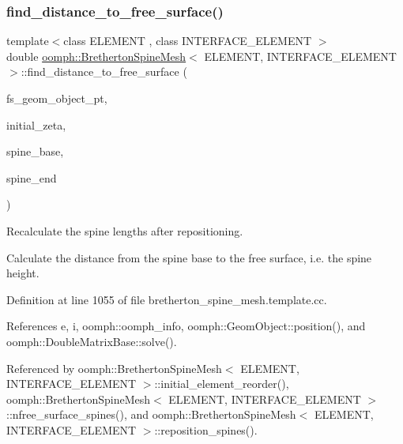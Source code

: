 \subsubsection{\texorpdfstring{find\+\_\+distance\+\_\+to\+\_\+free\+\_\+surface()}{find\_distance\_to\_free\_surface()}}
{\footnotesize\ttfamily template$<$class E\+L\+E\+M\+E\+NT , class I\+N\+T\+E\+R\+F\+A\+C\+E\+\_\+\+E\+L\+E\+M\+E\+NT $>$ \\
double \hyperlink{classoomph_1_1BrethertonSpineMesh}{oomph\+::\+Bretherton\+Spine\+Mesh}$<$ E\+L\+E\+M\+E\+NT, I\+N\+T\+E\+R\+F\+A\+C\+E\+\_\+\+E\+L\+E\+M\+E\+NT $>$\+::find\+\_\+distance\+\_\+to\+\_\+free\+\_\+surface (\begin{DoxyParamCaption}\item[{\hyperlink{classoomph_1_1GeomObject}{Geom\+Object} $\ast$const \&}]{fs\+\_\+geom\+\_\+object\+\_\+pt,  }\item[{\hyperlink{classoomph_1_1Vector}{Vector}$<$ double $>$ \&}]{initial\+\_\+zeta,  }\item[{const \hyperlink{classoomph_1_1Vector}{Vector}$<$ double $>$ \&}]{spine\+\_\+base,  }\item[{const \hyperlink{classoomph_1_1Vector}{Vector}$<$ double $>$ \&}]{spine\+\_\+end }\end{DoxyParamCaption})}



Recalculate the spine lengths after repositioning. 

Calculate the distance from the spine base to the free surface, i.\+e. the spine height. 

Definition at line 1055 of file bretherton\+\_\+spine\+\_\+mesh.\+template.\+cc.



References e, i, oomph\+::oomph\+\_\+info, oomph\+::\+Geom\+Object\+::position(), and oomph\+::\+Double\+Matrix\+Base\+::solve().



Referenced by oomph\+::\+Bretherton\+Spine\+Mesh$<$ E\+L\+E\+M\+E\+N\+T, I\+N\+T\+E\+R\+F\+A\+C\+E\+\_\+\+E\+L\+E\+M\+E\+N\+T $>$\+::initial\+\_\+element\+\_\+reorder(), oomph\+::\+Bretherton\+Spine\+Mesh$<$ E\+L\+E\+M\+E\+N\+T, I\+N\+T\+E\+R\+F\+A\+C\+E\+\_\+\+E\+L\+E\+M\+E\+N\+T $>$\+::nfree\+\_\+surface\+\_\+spines(), and oomph\+::\+Bretherton\+Spine\+Mesh$<$ E\+L\+E\+M\+E\+N\+T, I\+N\+T\+E\+R\+F\+A\+C\+E\+\_\+\+E\+L\+E\+M\+E\+N\+T $>$\+::reposition\+\_\+spines().

\mbox{\label{classoomph_1_1BrethertonSpineMesh_a52ffe1a705cb720d09c831b9cf5397f6}} 
